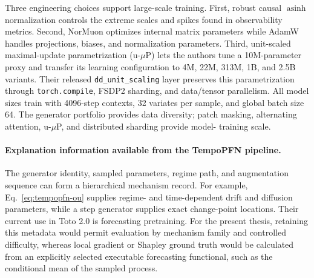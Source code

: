 Three engineering choices support large-scale training. First, robust causal
$\operatorname{asinh}$ normalization controls the extreme scales and spikes
found in observability metrics. Second, NorMuon optimizes internal matrix
parameters while AdamW handles projections, biases, and normalization
parameters. Third, unit-scaled maximal-update parametrization (u-$\mu$P) lets
the authors tune a 10M-parameter proxy and transfer its learning configuration
to 4M, 22M, 313M, 1B, and 2.5B variants. Their released
\texttt{dd\_unit\_scaling} layer preserves this parametrization through
\texttt{torch.compile}, FSDP2 sharding, and data/tensor parallelism. All model
sizes train with 4096-step contexts, 32 variates per sample, and global batch
size 64. The generator portfolio provides data diversity; patch masking,
alternating attention, u-$\mu$P, and distributed sharding provide model-
training scale.

\paragraph{Explanation information available from the TempoPFN pipeline.}
The generator identity, sampled parameters, regime path, and augmentation
sequence can form a hierarchical mechanism record. For example,
Eq.~\eqref{eq:tempopfn-ou} supplies regime- and time-dependent drift and
diffusion parameters, while a step generator supplies exact change-point
locations. Their current use in Toto 2.0 is forecasting pretraining. For the
present thesis, retaining this metadata would permit evaluation by mechanism
family and controlled difficulty, whereas local gradient or Shapley ground
truth would be calculated from an explicitly selected executable forecasting
functional, such as the conditional mean of the sampled process.

